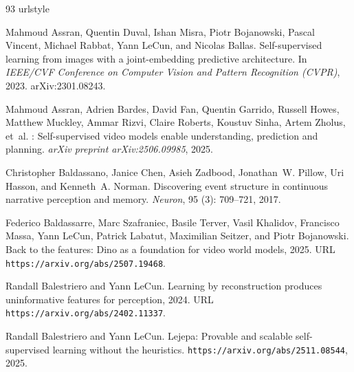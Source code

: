 \begin{thebibliography}{93}
\providecommand{\natexlab}[1]{#1}
\providecommand{\url}[1]{\texttt{#1}}
\expandafter\ifx\csname urlstyle\endcsname\relax
  \providecommand{\doi}[1]{doi: #1}\else
  \providecommand{\doi}{doi: \begingroup \urlstyle{rm}\Url}\fi

Mahmoud Assran, Quentin Duval, Ishan Misra, Piotr Bojanowski, Pascal Vincent,
  Michael Rabbat, Yann LeCun, and Nicolas Ballas.
\newblock Self-supervised learning from images with a joint-embedding
  predictive architecture.
\newblock In \emph{IEEE/CVF Conference on Computer Vision and Pattern
  Recognition (CVPR)}, 2023.
\newblock arXiv:2301.08243.

Mahmoud Assran, Adrien Bardes, David Fan, Quentin Garrido, Russell Howes,
  Matthew Muckley, Ammar Rizvi, Claire Roberts, Koustuv Sinha, Artem Zholus,
  et~al.
: Self-supervised video models enable understanding,
  prediction and planning.
\newblock \emph{arXiv preprint arXiv:2506.09985}, 2025.

Christopher Baldassano, Janice Chen, Asieh Zadbood, Jonathan~W. Pillow, Uri
  Hasson, and Kenneth~A. Norman.
\newblock Discovering event structure in continuous narrative perception and
  memory.
\newblock \emph{Neuron}, 95 (3): 709--721, 2017.

Federico Baldassarre, Marc Szafraniec, Basile Terver, Vasil Khalidov, Francisco
  Massa, Yann LeCun, Patrick Labatut, Maximilian Seitzer, and Piotr Bojanowski.
\newblock Back to the features: Dino as a foundation for video world models,
  2025.
\newblock URL \url{https://arxiv.org/abs/2507.19468}.

Randall Balestriero and Yann LeCun.
\newblock Learning by reconstruction produces uninformative features for
  perception, 2024.
\newblock URL \url{https://arxiv.org/abs/2402.11337}.

Randall Balestriero and Yann LeCun.
\newblock Lejepa: Provable and scalable self-supervised learning without the
  heuristics.
\newblock \url{https://arxiv.org/abs/2511.08544}, 2025.


\end{thebibliography}
